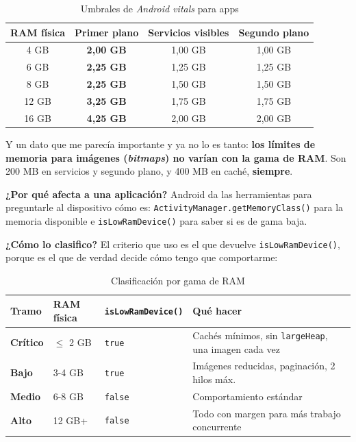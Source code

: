 \documentclass[11pt,a4paper]{article}
\newcommand{\code}[1]{\texttt{\color{navylight}#1}}
\newcommand{\campo}[1]{\textbf{\color{navy}#1}}
\begin{document}
	\begin{table}[htbp]
		\centering
		\small
		\begin{tabular}{@{}c c c c@{}}
			\toprule
			\rowcolor{primary}
			\textcolor{paper}{\sffamily\bfseries RAM física} & \textcolor{paper}{\sffamily\bfseries Primer plano} & \textcolor{paper}{\sffamily\bfseries Servicios visibles} & \textcolor{paper}{\sffamily\bfseries Segundo plano} \\
			\midrule
			4 GB & \textbf{2,00 GB} & 1,00 GB & 1,00 GB \\
			\rowcolor{soft}
			6 GB & \textbf{2,25 GB} & 1,25 GB & 1,25 GB \\
			8 GB & \textbf{2,25 GB} & 1,50 GB & 1,50 GB \\
			\rowcolor{soft}
			12 GB & \textbf{3,25 GB} & 1,75 GB & 1,75 GB \\
			16 GB & \textbf{4,25 GB} & 2,00 GB & 2,00 GB \\
			\bottomrule
		\end{tabular}
		\caption{Umbrales de \emph{Android vitals} para apps}
	\end{table}
	
	Y un dato que me parecía importante y ya no lo es tanto: \textbf{los límites de memoria para imágenes (\emph{bitmaps}) no varían con la gama de RAM}. Son 200 MB en servicios y segundo plano, y 400 MB en caché, \textbf{siempre}.
	
	\campo{¿Por qué afecta a una aplicación?}
	Android da las herramientas para preguntarle al dispositivo cómo es: \code{ActivityManager.getMemoryClass()} para la memoria disponible e \code{isLowRamDevice()} para saber si es de gama baja.
	
	\campo{¿Cómo lo clasifico?}
	El criterio que uso es el que devuelve \code{isLowRamDevice()}, porque es el que de verdad decide cómo tengo que comportarme:
	
	\begin{table}[htbp]
		\centering
		\small
		\begin{tabularx}{\textwidth}{@{}l l l >{\RaggedRight\arraybackslash}X@{}}
			\toprule
			\rowcolor{primary}
			\textcolor{paper}{\sffamily\bfseries Tramo} & \textcolor{paper}{\sffamily\bfseries RAM física} & \textcolor{paper}{\sffamily\bfseries \code{isLowRamDevice()}} & \textcolor{paper}{\sffamily\bfseries Qué hacer} \\
			\midrule
			\textbf{Crítico} & $\leq$ 2 GB & \code{true} & Cachés mínimos, sin \code{largeHeap}, una imagen cada vez \\
			\rowcolor{soft}
			\textbf{Bajo} & 3-4 GB & \code{true} & Imágenes reducidas, paginación, 2 hilos máx. \\
			\textbf{Medio} & 6-8 GB & \code{false} & Comportamiento estándar \\
			\rowcolor{soft}
			\textbf{Alto} & 12 GB+ & \code{false} & Todo con margen para más trabajo concurrente \\
			\bottomrule
		\end{tabularx}
		\caption{Clasificación por gama de RAM}
	\end{table}
	
\end{document}
